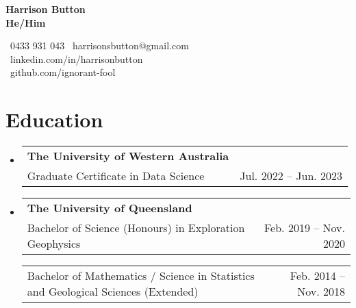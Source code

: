 \documentclass[letterpaper,11pt]{article}
\makeatletter
\newcommand{\resumeItem}[2]{
  \item\small{
    \textbf{#1}{#2 \vspace{-2pt}}
  }
}
\newcommand{\resumeSubheading}[4]{
  \vspace{-1pt}\item
    \begin{tabular*}{0.97\textwidth}[t]{l@{\extracolsep{\fill}}r}
      \textbf{#1} & #2 \\
      {\small #3} & {\small #4} \\
    \end{tabular*}\vspace{-5pt}
}
\newcommand{\resumeSubSubheading}[2]{
    \begin{tabular*}{0.97\textwidth}{l@{\extracolsep{\fill}}r}
      {\small#1} & {\small #2} \\
    \end{tabular*}\vspace{-5pt}
}
\newcommand{\resumeSubHeadingListStart}{\begin{itemize}[leftmargin=*]}
\newcommand{\resumeSubHeadingListEnd}{\end{itemize}}
\makeatother
\begin{document}
\begin{minipage}[c]{.4\linewidth}
    {\textbf{\Huge Harrison Button \\ \small{He/Him} }}%
\end{minipage}%
\begin{minipage}[c]{.6\linewidth}
    \begin{flushright}
        ~0433 931 043 \hspace{1pt} ~harrisonsbutton@gmail.com \\
        ~linkedin.com/in/harrisonbutton \\ 
        ~github.com/ignorant-fool
    \end{flushright}
\end{minipage}

    

\section{Education}
\resumeSubHeadingListStart
\resumeSubheading
    {The University of Western Australia}{}
    {Graduate Certificate in Data Science}{Jul. 2022 -- Jun. 2023}
\resumeSubheading
    {The University of Queensland}{}
    {Bachelor of Science (Honours) in Exploration Geophysics}{Feb. 2019 -- Nov. 2020}
\resumeSubSubheading
    {Bachelor of Mathematics / Science in Statistics and Geological Sciences (Extended)}{Feb. 2014 -- Nov. 2018}
\resumeSubHeadingListEnd
\end{document}
